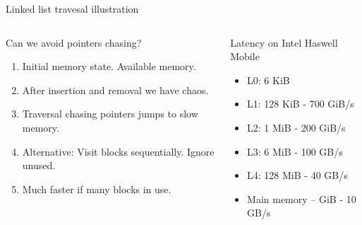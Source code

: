 \documentclass[10pt,aspectratio=169]{beamer}
\def\mbq{\node[style=mbq]}
\begin{document}
\begin{frame}[fragile]{Linked list travesal illustration}
\begin{columns}
\begin{column}{0.6\textwidth}
Can we avoid pointers chasing?
\begin{enumerate}
\item<alert@1> Initial memory state. Available memory.
\item<alert@2> After insertion and removal we have chaos.
\item<alert@3> Traversal chasing pointers jumps to slow memory.
\item<alert@4> Alternative: Visit blocks sequentially. Ignore unused.
\item<alert@4> Much faster if many blocks in use.
\end{enumerate}
\end{column}
\begin{column}{0.4\textwidth}
Latency on Intel Haswell Mobile 
\begin{itemize}
    \item<alert@3> L0: 6 KiB
    \item<alert@3> L1: 128 KiB - 700 GiB/s
    \item<alert@3> L2: 1 MiB - 200 GiB/s
    \item<alert@3> L3: 6 MiB - 100 GB/s
    \item<alert@3> L4: 128 MiB - 40 GB/s
    \item<alert@3> Main memory – GiB - 10 GB/s
\end{itemize}

\end{column}
\end{columns}

\end{frame}
\end{document}
